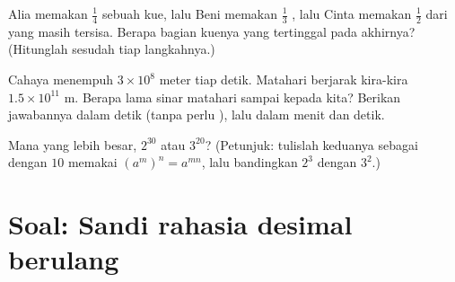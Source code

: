 \begin{exercise}[$\star\star$]\label{exo:g9:fractions:8}
Alia memakan $\frac14$ sebuah kue, lalu Beni memakan $\frac13$ ,
lalu Cinta memakan $\frac12$ dari yang masih tersisa. Berapa bagian
kuenya yang tertinggal pada akhirnya? (Hitunglah  sesudah tiap
langkahnya.)
\end{exercise}

\begin{exercise}[$\star\star$]\label{exo:g9:fractions:9}
Cahaya menempuh $3 \times 10^8$ meter tiap detik. Matahari berjarak
kira-kira $1.5 \times 10^{11}$ m. Berapa lama sinar matahari sampai
kepada kita? Berikan jawabannya dalam detik (tanpa perlu ), lalu dalam menit dan detik.
\end{exercise}

\begin{exercise}[$\star\star\star$]\label{exo:g9:fractions:10}
Mana yang lebih besar, $2^{30}$ atau $3^{20}$? (Petunjuk: tulislah
keduanya sebagai  dengan  $10$ memakai
$\left(a^m\right)^n = a^{mn}$, lalu bandingkan $2^3$ dengan
$3^2$.)
\end{exercise}

\section{Soal: Sandi rahasia desimal berulang}

